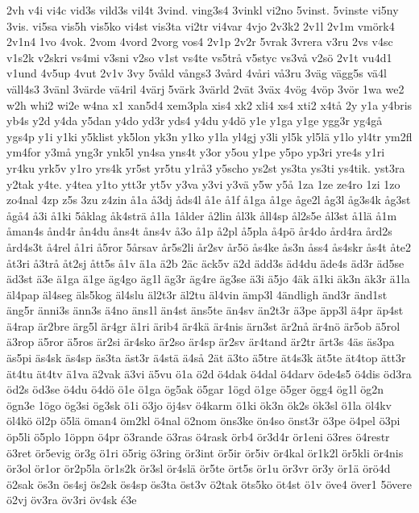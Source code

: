 {2vh
v4i
vi4c
vid3s
vild3s
vil4t
3vind.
ving3s4
3vinkl
vi2no
5vinst.
5vinste
vi5ny
3vis.
vi5sa
vis5h
vis5ko
vi4st
vis3ta
vi2tr
vi4var
4vjo
2v3k2
2v1l
2v1m
vmörk4
2v1n4
1vo
4vok.
2vom
4vord
2vorg
vos4
2v1p
2v2r
5vrak
3vrera
v3ru
2vs
v4sc
v1s2k
v2skri
vs4mi
v3sni
v2so
v1st
vs4te
vs5trå
v5styc
vs3vå
v2sö
2v1t
vu4d1
v1und
4v5up
4vut
2v1v
3vy
5våld
vångs3
3vård
4våri
vå3ru
3väg
vägg5s
vä4l
väll4s3
3vänl
3värde
vä4ril
4värj
5värk
3värld
2vät
3väx
4vög
4vöp
3vör
1wa
we2
w2h
whi2
wi2e
w4na
x1
xan5d4
xem3pla
xis4
xk2
xli4
xs4
xti2
x4tå
2y
y1a
y4bris
yb4s
y2d
y4da
y5dan
y4do
yd3r
yds4
y4du
y4dö
y1e
y1ga
y1ge
ygg3r
yg4gå
ygs4p
y1i
y1ki
y5klist
yk5lon
yk3n
y1ko
y1la
yl4gj
y3li
yl5k
yl5lä
y1lo
yl4tr
ym2fl
ym4for
y3må
yng3r
ynk5l
yn4sa
yns4t
y3or
y5ou
y1pe
y5po
yp3ri
yre4s
y1ri
yr4ku
yrk5v
y1ro
yrs4k
yr5st
yr5tu
y1rå3
y5scho
ys2st
ys3ta
ys3ti
ys4tik.
yst3ra
y2tak
y4te.
y4tea
y1to
ytt3r
yt5v
y3va
y3vi
y3vä
y5w
y5å
1za
1ze
ze4ro
1zi
1zo
zo4nal
4zp
z5s
3zu
z4zin
å1a
å3dj
åds4l
å1e
å1f
å1ga
å1ge
åge2l
åg3l
åg3s4k
åg3st
ågå4
å3i
å1ki
5åklag
åk4strä
å1la
1ålder
å2lin
ål3k
åll4sp
ål2s5e
ål3st
å1lä
å1m
åman4s
ånd4r
ån4du
åns4t
åns4v
å3o
å1p
å2pl
å5pla
å4pö
år4do
ård4ra
ård2s
ård4s3t
å4rel
å1ri
å5ror
5årsav
år5s2li
år2sv
år5ö
ås4ke
ås3n
åss4
ås4skr
ås4t
åte2
åt3ri
å3trå
åt2sj
ått5s
å1v
ä1a
ä2b
2äc
äck5v
ä2d
ädd3s
äd4du
äde4s
äd3r
äd5se
äd3st
ä3e
ä1ga
ä1ge
äg4go
äg1l
äg3r
äg4re
äg3se
ä3i
ä5jo
4äk
ä1ki
äk3n
äk3r
ä1la
äl4pap
äl4seg
äls5kog
äl4slu
äl2t3r
äl2tu
äl4vin
ämp3l
4ändligh
änd3r
änd1st
äng5r
änni3s
änn3s
ä4no
äns1l
än4st
äns5te
än4sv
än2t3r
ä3pe
äpp3l
ä4pr
äp4st
ä4rap
är2bre
ärg5l
är4gr
ä1ri
ärib4
är4kä
är4nis
ärn3st
är2nå
är4nö
är5ob
ä5rol
ä3rop
ä5ror
ä5ros
är2si
är4sko
är2so
är4sp
är2sv
är4tand
är2tr
ärt3s
4äs
äs3pa
äs5pi
äs4sk
äs4sp
äs3ta
äst3r
ä4stä
ä4så
2ät
ä3to
ä5tre
ät4s3k
ät5te
ät4top
ätt3r
ät4tu
ät4tv
ä1va
ä2vak
ä3vi
ä5vu
ö1a
ö2d
ö4dak
ö4dal
ö4darv
öde4s5
ö4dis
öd3ra
öd2s
öd3se
ö4du
ö4dö
ö1e
ö1ga
ög5ak
ö5gar
1ögd
ö1ge
ö5ger
ögg4
ög1l
ög2n
ögn3e
1ögo
ög3si
ög3sk
ö1i
ö3jo
öj4sv
ö4karm
ö1ki
ök3n
ök2s
ök3sl
ö1la
öl4kv
öl4kö
öl2p
ö5lä
öman4
öm2kl
ö4nal
ö2nom
öns3ke
ön4so
önst3r
ö3pe
ö4pel
ö3pi
öp5li
ö5plo
1öppn
ö4pr
ö3rande
ö3ras
ö4rask
örb4
ör3d4r
ör1eni
ö3res
ö4restr
ö3ret
ör5evig
ör3g
ö1ri
ö5rig
ö3ring
ör3int
ör5ir
ör5iv
ör4kal
ör1k2l
ör5kli
ör4nis
ör3ol
ör1or
ör2p5la
ör1s2k
ör3sl
ör4slä
ör5te
ört5s
ör1u
ör3vr
ör3y
ör1ä
örö4d
ö2sak
ös3n
ös4sj
ös2sk
ös4sp
ös3ta
öst3v
ö2tak
öts5ko
öt4st
ö1v
öve4
över1
5övere
ö2vj
öv3ra
öv3ri
öv4sk
é3e
}
